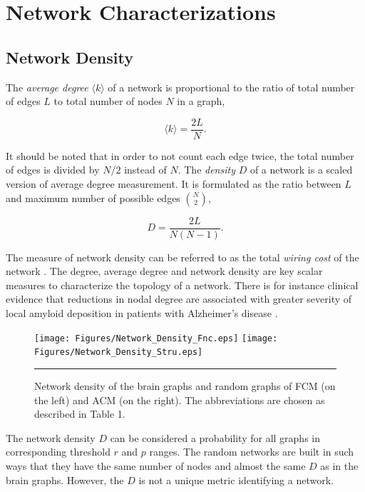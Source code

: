 \section{Network Characterizations}

\subsection{Network Density}
The \textit{average degree} $\langle k \rangle$ of a network is proportional to the ratio of total number of edges $L$ to total number of nodes $N$ in a graph, 

\begin{equation}
\langle k \rangle = \frac{2L}{N}.
\end{equation}

It should be noted that in order to not count each edge twice, the total number of edges is divided by $N/2$ instead of $N$. The \textit{density} $D$ of a network is a scaled version of average degree measurement. It is formulated as the ratio between $L$ and maximum number of possible edges ${N \choose 2}$,

\begin{equation}
D = \frac{2L}{N(N-1)}.
\end{equation}	

The measure of network density can be referred to as the total \textit{wiring cost} of the network \citep{RUB10}. The degree, average degree and network density are key scalar measures to characterize the topology of a network. There is for instance clinical evidence that reductions in nodal degree are associated with greater severity of local amyloid deposition in patients with Alzheimer's disease \citep{XYZ2009}. 

\begin{figure}[htbp]
  \centering
	\texttt{[image: Figures/Network\_Density\_Fnc.eps]}
	\texttt{[image: Figures/Network\_Density\_Stru.eps]}  
    \rule{35em}{0.5pt}
    \caption[Network Density]{Network density of the brain graphs and random graphs of FCM (on the left) and ACM (on the right). The abbreviations are chosen as described in Table 1.}
  \label{fig:Network Density}
\end{figure}


The network density $D$ can be considered a probability for all graphs in corresponding threshold $r$ and $p$ ranges. The random networks are built in such ways that they have the same number of nodes and almost the same $D$ as in the brain graphs. However, the $D$ is not a unique metric identifying a network.

